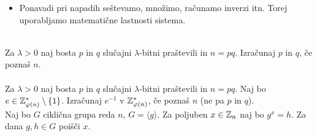 \begin{itemize}
    \item Ponavadi pri napadih seštevamo, množimo, računamo inverzi itn. Torej uporabljamo matematične lastnosti sistema.
\end{itemize}
\\
Za \(\lambda > 0\) naj bosta \(p\) in \(q\) slučajni \(\lambda\)-bitni praštevili in \(n = pq\). Izračunaj \(p\) in \(q\), če poznaš \(n\).\\
\\
Za \(\lambda > 0\) naj bosta \(p\) in \(q\) slučajni \(\lambda\)-bitni praštevili in \(n = pq\). Naj bo \(e \in \mathbb{Z}_{\varphi(n)}^* \setminus \{1\}\). Izračunaj \(e^{-1}\) v \(\mathbb{Z}_{\varphi(n)}^*\), če poznaš \(n\) (ne pa \(p\) in \(q\)).
\\
Naj bo \(G\) ciklična grupa reda \(n\), \(G = \langle g \rangle\). Za poljuben \(x \in \mathbb{Z}_n\) naj bo \(g^x = h\). Za dana \(g, h \in G\) poišči \(x\).
\newcolumn